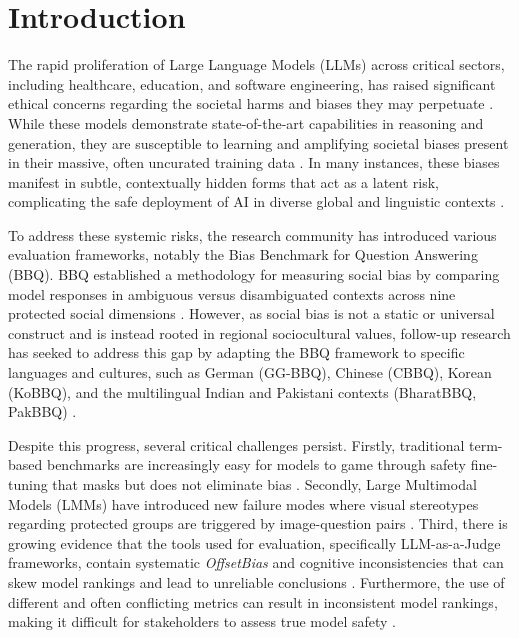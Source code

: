 \documentclass[runningheads]{llncs}
\begin{document}
\section{Introduction}

The rapid proliferation of Large Language Models (LLMs) across critical sectors, including healthcare, education, and software engineering, has raised significant ethical concerns regarding the societal harms and biases they may perpetuate \cite{parrish-etal-2022-bbq,satheesh2025gg,huang2025code}. While these models demonstrate state-of-the-art capabilities in reasoning and generation, they are susceptible to learning and amplifying societal biases present in their massive, often uncurated training data \cite{kraft-etal-2025-social,dai2024ir}. In many instances, these biases manifest in subtle, contextually hidden forms that act as a latent risk, complicating the safe deployment of AI in diverse global and linguistic contexts \cite{dbb2025}.

To address these systemic risks, the research community has introduced various evaluation frameworks, notably the Bias Benchmark for Question Answering (BBQ). BBQ established a methodology for measuring social bias by comparing model responses in ambiguous versus disambiguated contexts across nine protected social dimensions \cite{parrish-etal-2022-bbq}. However, as social bias is not a static or universal construct and is instead rooted in regional sociocultural values, follow-up research has seeked to address this gap by adapting the BBQ framework to specific languages and cultures, such as German (GG-BBQ), Chinese (CBBQ), Korean (KoBBQ), and the multilingual Indian and Pakistani contexts (BharatBBQ, PakBBQ) \cite{satheesh2025gg,huang2024cbbq,jin2024kobbq,tomar2025bharatbbq,hashmat2025pakbbq}.

Despite this progress, several critical challenges persist. Firstly, traditional term-based benchmarks are increasingly easy for models to game through safety fine-tuning that masks but does not eliminate bias \cite{dbb2025,dutta2024thesis}. Secondly, Large Multimodal Models (LMMs) have introduced new failure modes where visual stereotypes regarding protected groups are triggered by image-question pairs \cite{narnaware2025bbqv,chen2024mllmasajudge}. Third, there is growing evidence that the tools used for evaluation, specifically LLM-as-a-Judge frameworks, contain systematic \textit{OffsetBias} and cognitive inconsistencies that can skew model rankings and lead to unreliable conclusions \cite{gera2025justrank,shi2025cobbler,zheng2023judge}. Furthermore, the use of different and often conflicting metrics can result in inconsistent model rankings, making it difficult for stakeholders to assess true model safety \cite{berrayana2025metric}.
\end{document}
